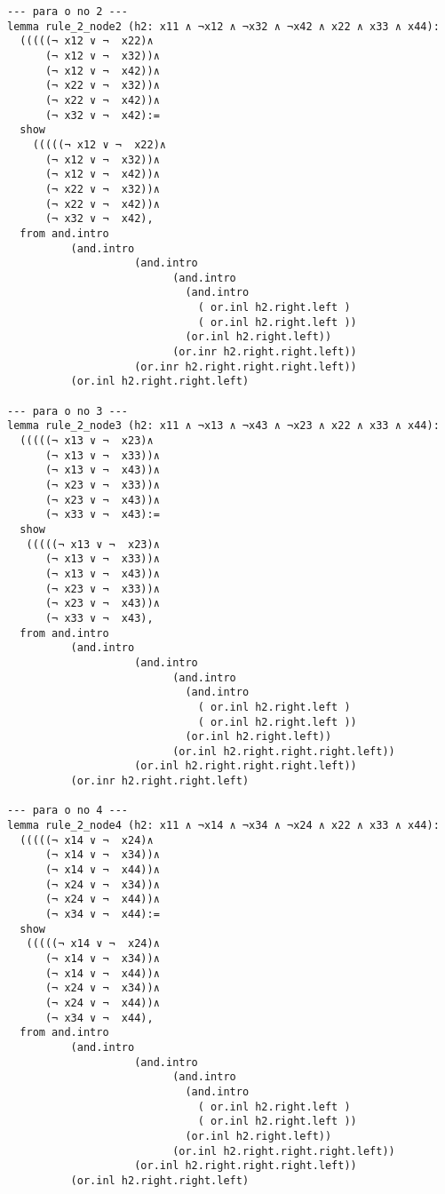 \begin{enumerate}
\begin{lstlisting}
--- para o no 2 ---
lemma rule_2_node2 (h2: x11 ∧ ¬x12 ∧ ¬x32 ∧ ¬x42 ∧ x22 ∧ x33 ∧ x44):
  (((((¬ x12 ∨ ¬  x22)∧
      (¬ x12 ∨ ¬  x32))∧ 
      (¬ x12 ∨ ¬  x42))∧ 
      (¬ x22 ∨ ¬  x32))∧ 
      (¬ x22 ∨ ¬  x42))∧ 
      (¬ x32 ∨ ¬  x42):=
  show
    (((((¬ x12 ∨ ¬  x22)∧
      (¬ x12 ∨ ¬  x32))∧ 
      (¬ x12 ∨ ¬  x42))∧ 
      (¬ x22 ∨ ¬  x32))∧ 
      (¬ x22 ∨ ¬  x42))∧ 
      (¬ x32 ∨ ¬  x42),
  from and.intro
          (and.intro
                    (and.intro
                          (and.intro
                            (and.intro
                              ( or.inl h2.right.left ) 
                              ( or.inl h2.right.left ))
                            (or.inl h2.right.left))
                          (or.inr h2.right.right.left))
                    (or.inr h2.right.right.right.left))
          (or.inl h2.right.right.left)

--- para o no 3 ---
lemma rule_2_node3 (h2: x11 ∧ ¬x13 ∧ ¬x43 ∧ ¬x23 ∧ x22 ∧ x33 ∧ x44):
  (((((¬ x13 ∨ ¬  x23)∧
      (¬ x13 ∨ ¬  x33))∧ 
      (¬ x13 ∨ ¬  x43))∧ 
      (¬ x23 ∨ ¬  x33))∧ 
      (¬ x23 ∨ ¬  x43))∧ 
      (¬ x33 ∨ ¬  x43):=
  show
   (((((¬ x13 ∨ ¬  x23)∧
      (¬ x13 ∨ ¬  x33))∧ 
      (¬ x13 ∨ ¬  x43))∧ 
      (¬ x23 ∨ ¬  x33))∧ 
      (¬ x23 ∨ ¬  x43))∧ 
      (¬ x33 ∨ ¬  x43),
  from and.intro
          (and.intro
                    (and.intro
                          (and.intro
                            (and.intro
                              ( or.inl h2.right.left ) 
                              ( or.inl h2.right.left ))
                            (or.inl h2.right.left))
                          (or.inl h2.right.right.right.left))
                    (or.inl h2.right.right.right.left))
          (or.inr h2.right.right.left)

--- para o no 4 ---
lemma rule_2_node4 (h2: x11 ∧ ¬x14 ∧ ¬x34 ∧ ¬x24 ∧ x22 ∧ x33 ∧ x44):
  (((((¬ x14 ∨ ¬  x24)∧
      (¬ x14 ∨ ¬  x34))∧ 
      (¬ x14 ∨ ¬  x44))∧ 
      (¬ x24 ∨ ¬  x34))∧ 
      (¬ x24 ∨ ¬  x44))∧ 
      (¬ x34 ∨ ¬  x44):=
  show
   (((((¬ x14 ∨ ¬  x24)∧
      (¬ x14 ∨ ¬  x34))∧ 
      (¬ x14 ∨ ¬  x44))∧ 
      (¬ x24 ∨ ¬  x34))∧ 
      (¬ x24 ∨ ¬  x44))∧ 
      (¬ x34 ∨ ¬  x44),
  from and.intro
          (and.intro
                    (and.intro
                          (and.intro
                            (and.intro
                              ( or.inl h2.right.left ) 
                              ( or.inl h2.right.left ))
                            (or.inl h2.right.left))
                          (or.inl h2.right.right.right.left))
                    (or.inl h2.right.right.right.left))
          (or.inl h2.right.right.left)


\end{lstlisting}
\end{enumerate}
